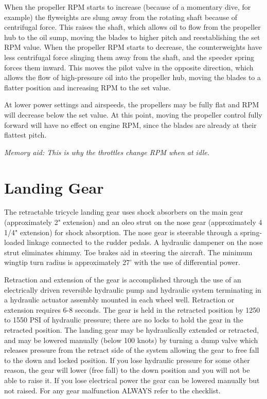 {When the propeller RPM starts to increase (because of a momentary dive, for example) the flyweights are slung
away from the rotating shaft because of centrifugal force. This raises the shaft, which allows oil to flow from the
propeller hub to the oil sump, moving the blades to higher pitch and reestablishing the set RPM value. When the
propeller RPM starts to decrease, the counterweights have less centrifugal force slinging them away from the shaft,
and the speeder spring forces them inward. This moves the pilot valve in the opposite direction, which allows the
flow of high-pressure oil into the propeller hub, moving the blades to a flatter position and increasing RPM to the set
value.

At lower power settings and airspeeds, the propellers may be fully flat and RPM will decrease below the set value.
At this point, moving the propeller control fully forward will have no effect on engine RPM, since the blades are
already at their flattest pitch.

\emph{Memory aid: This is why the throttles change RPM when at idle.}

\section{Landing Gear}

The retractable tricycle landing gear uses shock absorbers on the main gear (approximately 2" extension) and an
oleo strut on the nose gear (approximately 4 1/4" extension) for shock absorption. The nose gear is steerable
through a spring-loaded linkage connected to the rudder pedals. A hydraulic dampener on the nose strut eliminates
shimmy. Toe brakes aid in steering the aircraft. The minimum wingtip turn radius is approximately 27' with the use
of differential power.

Retraction and extension of the gear is accomplished through the use of an electrically driven reversible hydraulic
pump and hydraulic system terminating in a hydraulic actuator assembly mounted in each wheel well. Retraction or
extension requires 6-8 seconds. The gear is held in the retracted position by 1250 to 1550 PSI of hydraulic pressure;
there are no locks to hold the gear in the retracted position. The landing gear may be hydraulically extended or
retracted, and may be lowered manually (below 100 knots) by turning a dump valve which releases pressure from
the retract side of the system allowing the gear to free fall to the down and locked position. If you lose hydraulic
pressure for some other reason, the gear will lower (free fall) to the down position and you will not be able to raise
it. If you lose electrical power the gear can be lowered manually but not raised. For any gear malfunction
ALWAYS refer to the checklist.

}
